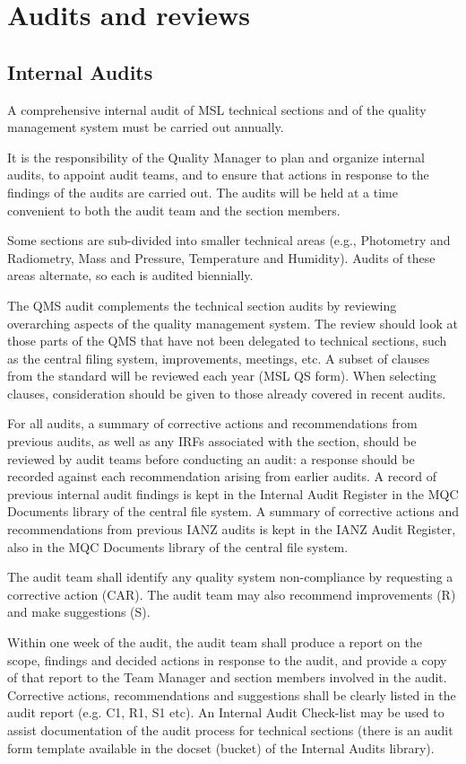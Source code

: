 \section{Audits and reviews}
\subsection{Internal Audits}
\label{ss:internal_audit}
A comprehensive internal audit of MSL technical sections and of the quality management system must be carried out annually. 

It is the responsibility of the Quality Manager to plan and organize internal audits, to appoint audit teams, and to ensure that actions in response to the findings of the audits are carried out. The audits will be held at a time convenient to both the audit team and the section members. 

Some sections are sub-divided into smaller technical areas (e.g., Photometry and Radiometry, Mass and Pressure, Temperature and Humidity). Audits of these areas alternate, so each is audited biennially.

The QMS audit complements the technical section audits by reviewing overarching aspects of the quality management system. The review should look at those parts of the QMS that have not been delegated to technical sections, such as the central filing system, improvements, meetings, etc. A subset of clauses from the standard will be reviewed each year (MSL QS form). When selecting clauses, consideration should be given to those already covered in recent audits. 

For all audits, a summary of corrective actions and recommendations from previous audits, as well as any IRFs associated with the section, should be reviewed by audit teams before conducting an audit: a response should be recorded against each recommendation arising from earlier audits. A record of previous internal audit findings is kept in the Internal Audit Register in the MQC Documents library of the central file system. A summary of corrective actions and recommendations from previous IANZ audits is kept in the IANZ Audit Register, also in the MQC Documents library of the central file system. 

The audit team shall identify any quality system non-compliance by requesting a corrective action (CAR). The audit team may also recommend improvements (R) and make suggestions (S). 

Within one week of the audit, the audit team shall produce a report on the scope, findings and decided actions in response to the audit, and provide a copy of that report to the Team Manager and section members involved in the audit.  Corrective actions, recommendations and suggestions shall be clearly listed in the audit report (e.g. C1, R1, S1 etc). An Internal Audit Check-list may be used to assist documentation of the audit process for technical sections (there is an audit form template available in the docset (bucket) of the Internal Audits library).

